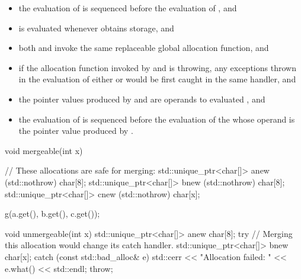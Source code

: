 \begin{itemize}
\item the evaluation of  is sequenced before the evaluation of
, and

\item {} is evaluated whenever  obtains storage, and

\item both  and  invoke the same replaceable global
allocation function, and

\item if the allocation function invoked by  and  is
throwing, any exceptions thrown in the evaluation of either  or
 would be first caught in the same handler, and

\item the pointer values produced by  and  are operands to
evaluated , and

\item the evaluation of  is sequenced before the evaluation of the
 whose operand is the pointer value produced
by .
\end{itemize}

\begin{example}
\begin{codeblock}
  void mergeable(int x) {
    // These allocations are safe for merging:
    std::unique_ptr<char[]> a{new (std::nothrow) char[8]};
    std::unique_ptr<char[]> b{new (std::nothrow) char[8]};
    std::unique_ptr<char[]> c{new (std::nothrow) char[x]};

    g(a.get(), b.get(), c.get());
  }

  void unmergeable(int x) {
    std::unique_ptr<char[]> a{new char[8]};
    try {
      // Merging this allocation would change its catch handler.
      std::unique_ptr<char[]> b{new char[x]};
    } catch (const std::bad_alloc& e) {
      std::cerr << "Allocation failed: " << e.what() << std::endl;
      throw;
    }
  }
\end{codeblock}
\end{example}

